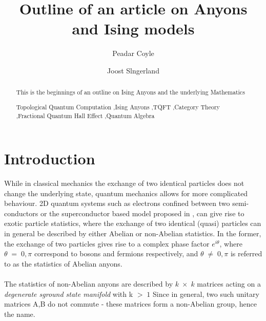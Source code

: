 \documentclass[preprint, 5p, authoryear, 12pt]{elsarticle}
\theoremstyle{plain}
\begin{document}
\begin{frontmatter}
 \title{Outline of an article on Anyons and Ising models }

 
 \author[rvt]{Peadar Coyle}
 
 \author[rvt]{Joost Slngerland}

 
 
 


 
 
 
\begin{abstract}
This is the beginnings of an outline  
on Ising Anyons and the underlying Mathematics

\begin{keyword}
Topological Quantum Computation \sep Ising Anyons \sep TQFT \sep Category Theory \sep Fractional Quantum Hall Effect \sep Quantum Algebra
\end{keyword}


\end{abstract}


\end{frontmatter}

\section{Introduction}\label{sec1}
While in classical mechanics the exchange of two identical particles does not change the underlying state, quantum mechanics 
allows for more complicated behaviour. 2D quantum systems such as electrons confined between two semi-conductors or the superconductor based
model proposed in \cite{Blueprint_TQC_2010}, can give rise to exotic particle statistics, where the exchange of two identical (quasi) particles 
can in general be described by either Abelian or non-Abelian statistics. In the former, the exchange of two particles gives rise to a complex 
phase factor $e^{i\theta}$, where $\theta\;=\;0,\pi$
correspond to bosons and fermions respectively, and $\theta \;\neq\;0,\pi$
is referred to as the statistics of Abelian anyons.
\paragraph{} The statistics of non-Abelian anyons are described by $k\;\times\;k$ matrices acting on a \textit{degenerate sground state manifold}
with k $> \;1$ Since in general, two such unitary matrices A,B do not commute - these matrices form a non-Abelian group, hence the name.
\end{document}
